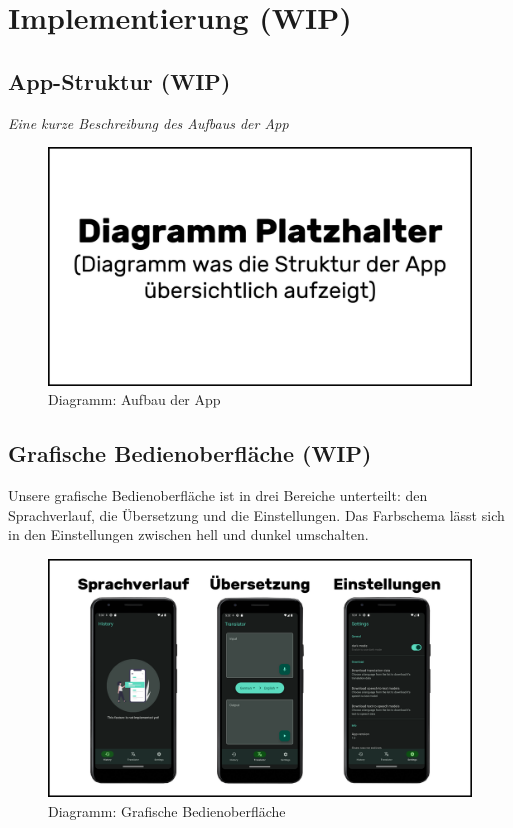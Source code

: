 \newpage
\section{Implementierung (WIP)}\label{sec:implementation}

\subsection{App-Struktur (WIP)}
\textit{Eine kurze Beschreibung des Aufbaus der App}
\newline

\begin{figure}[h]
    \includegraphics[width=\textwidth, center]{resources/diagram_structure.png}
    \caption[Diagramm: Aufbau der App]{Diagramm: Aufbau der App}
\end{figure}

\subsection{Grafische Bedienoberfläche (WIP)}
Unsere grafische Bedienoberfläche ist in drei Bereiche unterteilt: den Sprachverlauf, die Übersetzung und die Einstellungen. Das Farbschema lässt sich in den Einstellungen zwischen hell und dunkel umschalten. 

\begin{figure}[h]
    \includegraphics[width=\textwidth, center]{resources/diagram_graphics.png}
    \caption[Diagramm: Grafische Bedienoberfläche]{Diagramm: Grafische Bedienoberfläche}
\end{figure}


